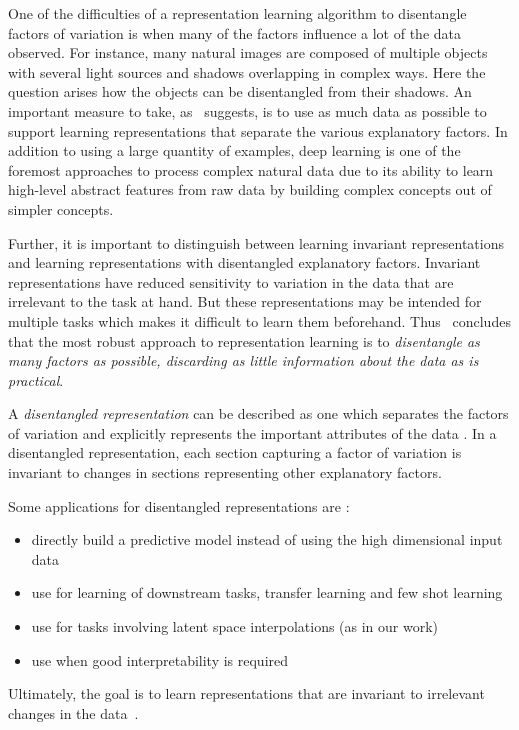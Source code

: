 \documentclass[12pt,a4paper]{article}
\begin{document}
One of the difficulties of a representation learning algorithm to disentangle factors of variation is when many of the factors influence a lot of the data observed. For instance, many natural images are composed of multiple objects with several light sources and shadows overlapping in complex ways. Here the question arises how the objects can be disentangled from their shadows. An important measure to take, as~\cite{ReprLearning} suggests, is to use as much data as possible to support learning representations that separate the various explanatory factors. In addition to using a large quantity of examples, deep learning is one of the foremost approaches to process complex natural data due to its ability to learn high-level abstract features from raw data by building complex concepts out of simpler concepts. 

Further, it is important to distinguish between learning invariant representations and learning representations with disentangled explanatory factors. Invariant representations have reduced sensitivity to variation in the data that are irrelevant to the task at hand. But these representations may be intended for multiple tasks which makes it difficult to learn them beforehand. Thus~\cite{ReprLearning} concludes that the most robust approach to representation learning is to \textit{disentangle as many factors as possible, discarding as little information about the data as is practical}.

A \textit{disentangled representation} can be described as one which separates the factors of variation and explicitly represents the important attributes of the data \cite{Framework4QuantEvalDisRepr}. In a disentangled representation, each section capturing a factor of variation is invariant to changes in sections representing other explanatory factors.

Some applications for disentangled representations are \cite{ChallengeAssLofDisRepr}:
\begin{itemize}
  \item directly build a predictive model instead of using the high dimensional input data
  \item use for learning of downstream tasks, transfer learning and few shot learning
  \item use for tasks involving latent space interpolations (as in our work)
  \item use when good interpretability is required
\end{itemize}
Ultimately, the goal is to learn representations that are invariant to irrelevant changes in the data~\cite{FwkQuantEvalDisRep}.
\end{document}
